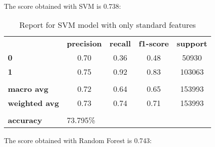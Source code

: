 The score obtained with SVM is 0.738:

\begin{table}[h!]
    \centering
    \begin{tabular}{lcccc}
        \rowcolor[HTML]{EEEEEE} 
        \cellcolor[HTML]{FBFBFB} & \textbf{precision} & \textbf{recall} & \textbf{f1-score} & \textbf{support} \\
        \rowcolor[HTML]{EEEEEE} 
        \textbf{0}               & 0.70               & 0.36            & 0.48              & 50930            \\
        \rowcolor[HTML]{EEEEEE} 
        \textbf{1}               & 0.75               & 0.92            & 0.83              & 103063           \\
        \rowcolor[HTML]{FBFBFB} 
        &                    &                 &                   &                  \\
        \rowcolor[HTML]{EEEEEE} 
        \textbf{macro avg}       & 0.72               & 0.64            & 0.65              & 153993           \\
        \rowcolor[HTML]{EEEEEE} 
        \textbf{weighted avg}    & 0.73               & 0.74            & 0.71              & 153993           \\
        \rowcolor[HTML]{FBFBFB} 
        &                    &                 &                   &                  \\
        \rowcolor[HTML]{EEEEEE} 
        \textbf{accuracy}        & \multicolumn{4}{l}{\cellcolor[HTML]{EEEEEE}73.795\%}                         
    \end{tabular}
    \caption{Report for SVM model with only standard features}
    \label{tab:svm-res-std}
\end{table}

The score obtained with Random Forest is 0.743:

